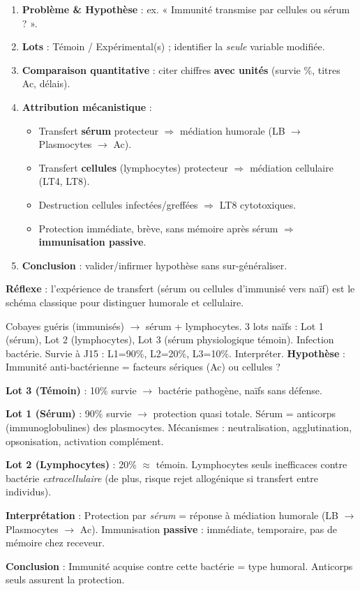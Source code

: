 \documentclass[11pt]{article}
\newcommand{\cle}[1]{{\popxbold\color{popdark}#1}}
\begin{document}
\begin{methode}
\begin{enumerate}
\item \textbf{Problème \& Hypothèse} : ex. « Immunité transmise par cellules ou sérum ? ».
\item \textbf{Lots} : Témoin / Expérimental(s) ; identifier la \emph{seule} variable modifiée.
\item \textbf{Comparaison quantitative} : citer chiffres \textbf{avec unités} (survie \%, titres Ac, délais).
\item \textbf{Attribution mécanistique} :
      \begin{itemize}
      \item Transfert \textbf{sérum} protecteur $\Rightarrow$ \cle{médiation humorale} (LB $\rightarrow$ Plasmocytes $\rightarrow$ Ac).
      \item Transfert \textbf{cellules} (lymphocytes) protecteur $\Rightarrow$ \cle{médiation cellulaire} (LT4, LT8).
      \item Destruction cellules infectées/greffées $\Rightarrow$ LT8 cytotoxiques.
      \item Protection immédiate, brève, sans mémoire après sérum $\Rightarrow$ \textbf{immunisation passive}.
      \end{itemize}
\item \textbf{Conclusion} : valider/infirmer hypothèse sans sur-généraliser.
\end{enumerate}
\textbf{Réflexe} : l'expérience de transfert (sérum ou cellules d'immunisé vers naïf) est le schéma classique pour distinguer humorale et cellulaire.
\end{methode}

\begin{exoresolu}
Cobayes guéris (immunisés) $\rightarrow$ sérum + lymphocytes. 3 lots naïfs : Lot 1 (sérum), Lot 2 (lymphocytes), Lot 3 (sérum physiologique témoin). Infection bactérie. Survie à J15 : L1=90\%, L2=20\%, L3=10\%. Interpréter.
\tcblower
\textbf{Hypothèse} : Immunité anti-bactérienne = facteurs sériques (Ac) ou cellules ?

\textbf{Lot 3 (Témoin)} : 10\% survie $\rightarrow$ bactérie pathogène, naïfs sans défense.

\textbf{Lot 1 (Sérum)} : 90\% survie $\rightarrow$ protection quasi totale. Sérum = \cle{anticorps} (immunoglobulines) des plasmocytes. Mécanismes : neutralisation, agglutination, opsonisation, activation complément.

\textbf{Lot 2 (Lymphocytes)} : 20\% $\approx$ témoin. Lymphocytes seuls inefficaces contre bactérie \emph{extracellulaire} (de plus, risque rejet allogénique si transfert entre individus).

\textbf{Interprétation} : Protection par \emph{sérum} = \cle{réponse à médiation humorale} (LB $\rightarrow$ Plasmocytes $\rightarrow$ Ac). Immunisation \textbf{passive} : immédiate, temporaire, pas de mémoire chez receveur.

\textbf{Conclusion} : Immunité acquise contre cette bactérie = type humoral. Anticorps seuls assurent la protection.
\end{exoresolu}
\end{document}

